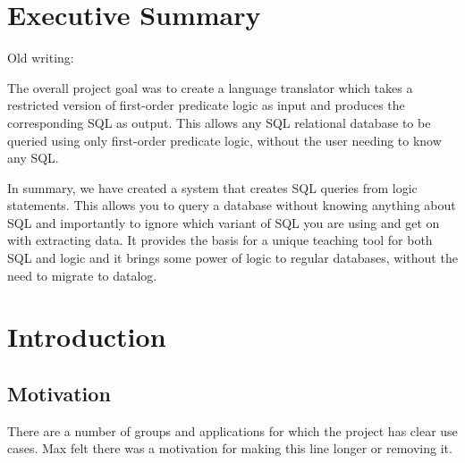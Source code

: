 \documentclass[a4paper, 11pt]{article}
\begin{document}
\renewcommand{\contentsname}{\huge Contents \vspace{1cm}}
\tableofcontents
\clearpage

\setlength{\parskip}{0.3cm} \setlength{\parindent}{0cm}

\section{Executive Summary}
  Old writing:

  The overall project goal was to create a language translator which
  takes a restricted version of first-order predicate logic as input and
  produces the corresponding SQL as output. This allows any SQL relational
  database to be queried using only first-order predicate logic, without the
  user needing to know any SQL.

  In summary, we have created a system that creates SQL queries from logic 
  statements. This allows you to query a database without knowing anything
  about SQL and importantly to ignore which variant of SQL you
  are using and get on with extracting data. It provides the basis for a
  unique teaching tool for both SQL and logic and it brings some power
  of logic to regular databases, without the need to migrate to datalog.

\section{Introduction}


  \subsection{Motivation}
    There are a number of groups and applications for which the project has
    clear use cases. Max felt there was a motivation for making this line longer
    or removing it.
\end{document}
